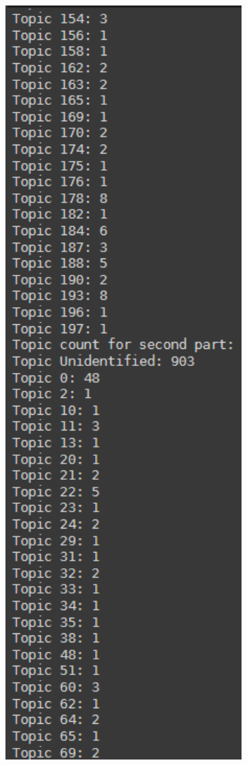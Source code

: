 \documentclass[a4paper]{article}
\begin{document}
\includegraphics[width=0.8\textwidth]{../images/LSI - 3.png}
\end{document}
